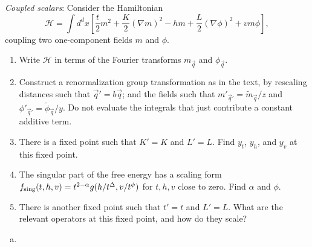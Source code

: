 \begin{problem}
    \textit{Coupled scalars}: Consider the Hamiltonian
    \[
        \mathcal{H} = \int d^dx\left[\frac{t}{2}m^2 + \frac{K}{2}(\nabla m)^2 - hm + \frac{L}{2}(\nabla\phi)^2 + vm\phi\right],
    \]
    coupling two one-component fields $m$ and $\phi$.

    \begin{enumerate}
        \item[(a)] Write $\mathcal{H}$ in terms of the Fourier transforms $m_{\vec{q}}$ and $\phi_{\vec{q}}$.

        \item[(b)] Construct a renormalization group transformation as in the text, by rescaling distances such that $\vec{q}' = b\vec{q}$; and the fields such that $m'_{\vec{q}'} = \tilde{m}_{\vec{q}}/z$ and $\phi'_{\vec{q}'} = \tilde{\phi}_{\vec{q}}/y$. Do not evaluate the integrals that just contribute a constant additive term.

        \item[(c)] There is a fixed point such that $K' = K$ and $L' = L$. Find $y_t$, $y_h$, and $y_v$ at this fixed point.

        \item[(d)] The singular part of the free energy has a scaling form $f_{\rm sing}(t,h,v) = t^{2-\alpha}g(h/t^\Delta, v/t^\phi)$ for $t, h, v$ close to zero. Find $\alpha$ and $\phi$.

        \item[(e)] There is another fixed point such that $t' = t$ and $L' = L$. What are the relevant operators at this fixed point, and how do they scale?
    \end{enumerate}
\end{problem}

\begin{solution}
    \begin{enumerate}[(a)]
        \item
    \end{enumerate}
\end{solution}
